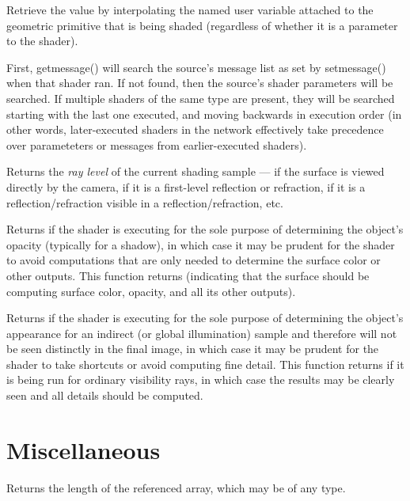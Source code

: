 \documentclass[11pt,letterpaper]{book}
\begin{document}
\vspace{10pt}
Retrieve the value by interpolating the named user variable attached
to the geometric primitive that is being shaded (regardless of whether
it is a parameter to the shader).
\apiend

First, {\cf getmessage()} will search the source's message list as set
by {\cf setmessage()} when that shader ran.  If not found, then the
source's shader parameters will be searched.  If multiple shaders of
the same type are present, they will be searched starting with the
last one executed, and moving backwards in execution order (in other
words, later-executed shaders in the network effectively take precedence
over parameteters or messages from earlier-executed shaders).
\apiend

Returns the \emph{ray level} of the current shading sample --- {}
if the surface is viewed directly by the camera, {} if it is a
first-level reflection or refraction, {} if it is a
reflection/refraction visible in a reflection/refraction, etc.
\apiend

Returns {} if the shader is executing for the sole purpose of
determining the object's opacity (typically for a shadow), in which case
it may be prudent for the shader to avoid computations that are only
needed to determine the surface color or other outputs.  This function
returns {} (indicating that the surface should be computing surface
color, opacity, and all its other outputs).
\apiend

Returns {} if the shader is executing for the sole purpose of
determining the object's appearance for an indirect (or global
illumination) sample and therefore will not be seen distinctly in the
final image, in which case it may be prudent for the shader to take
shortcuts or avoid computing fine detail.  This function returns {}
if it is being run for ordinary visibility rays, in which case the
results may be clearly seen and all details should be computed.
\apiend


\section{Miscellaneous}
\label{sec:stdlib:misc}

Returns the length of the referenced array, which may be of any type.
\apiend
\end{document}
